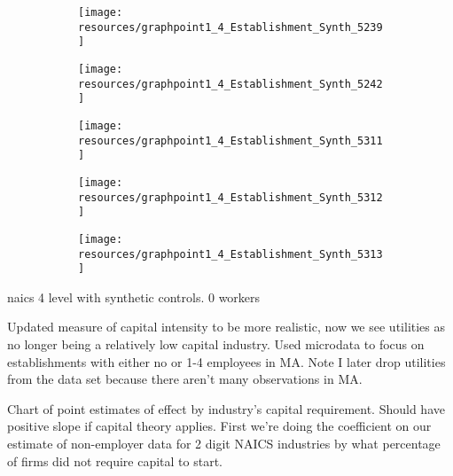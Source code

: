 \documentclass[12pt]{article}
\begin{document}
\begin{figure}[H]
	\centering
	\begin{subfigure}[b]{0.4\textwidth}
	    \texttt{[image: resources/graphpoint1\_4\_Establishment\_Synth\_5239]}
	\end{subfigure}
	\begin{subfigure}[b]{0.4\textwidth}
	    \texttt{[image: resources/graphpoint1\_4\_Establishment\_Synth\_5242]}
	\end{subfigure}
\end{figure}

\begin{figure}[H]
	\centering
	\begin{subfigure}[b]{0.4\textwidth}
	    \texttt{[image: resources/graphpoint1\_4\_Establishment\_Synth\_5311]}
	\end{subfigure}
	\begin{subfigure}[b]{0.4\textwidth}
	    \texttt{[image: resources/graphpoint1\_4\_Establishment\_Synth\_5312]}
	\end{subfigure}
\end{figure}

\begin{figure}[H]
	\centering
	\begin{subfigure}[b]{0.4\textwidth}
	    \texttt{[image: resources/graphpoint1\_4\_Establishment\_Synth\_5313]}
	\end{subfigure}
\end{figure}

\pagebreak

naics 4 level with synthetic controls. 0 workers

\pagebreak

\pagebreak

Updated measure of capital intensity to be more realistic, now we see utilities as no longer being a relatively low capital industry. Used microdata to focus on establishments with either no or 1-4 employees in MA. Note I later drop utilities from the data set because there aren't many observations in MA. 



\pagebreak

Chart of point estimates of effect by industry's capital requirement. Should have positive slope if capital theory applies. First we're doing the coefficient on our estimate of non-employer data for 2 digit NAICS industries by what percentage of firms did not require capital to start. 
\end{document}
